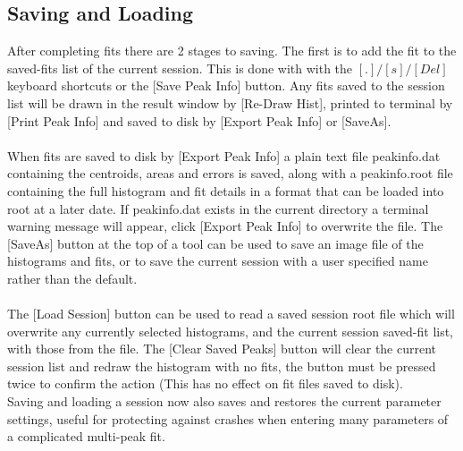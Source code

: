 \documentclass[a4paper,10pt]{article}
\begin{document}
\subsection{Saving and Loading}
After completing fits there are 2 stages to saving. The first is to add the fit to the saved-fits list of the current session.
This is done with with the $[.]/[s]/[Del]$ keyboard shortcuts or the [Save Peak Info] button.
Any fits saved to the session list will be drawn in the result window by [Re-Draw Hist], printed to terminal by [Print Peak Info] and saved to disk by [Export Peak Info] or [SaveAs].  
\\
\\
When fits are saved to disk by [Export Peak Info] a plain text file peakinfo.dat containing the centroids, areas and errors is saved, along with a peakinfo.root file containing the full histogram and fit details in a format that can be loaded into root at a later date.
If peakinfo.dat exists in the current directory a terminal warning message will appear, click [Export Peak Info] to overwrite the file.
The [SaveAs] button at the top of a tool can be used to save an image file of the histograms and fits, or to save the current session with a user specified name rather than the default.
\\
\\
The [Load Session] button can be used to read a saved session root file which will overwrite any currently selected histograms, and the current session saved-fit list, with those from the file.
The [Clear Saved Peaks] button will clear the current session list and redraw the histogram with no fits, the button must be pressed twice to confirm the action (This has no effect on fit files saved to disk).
\\
Saving and loading a session now also saves and restores the current parameter settings, useful for protecting against crashes when entering many parameters of a complicated multi-peak fit.
\end{document}

